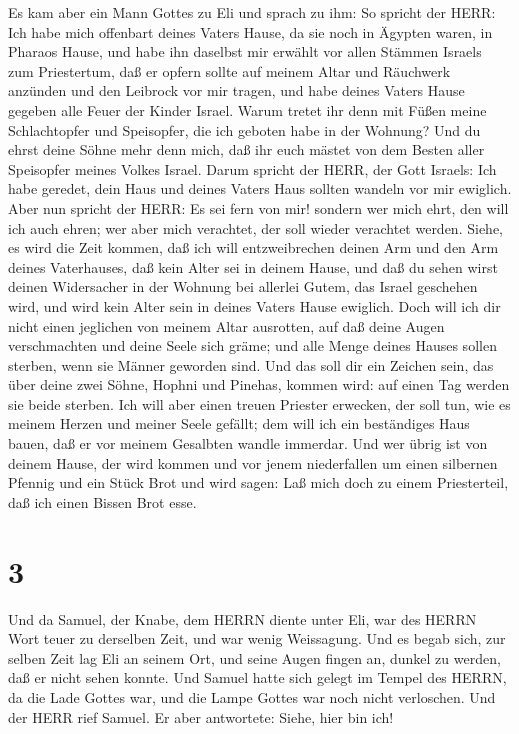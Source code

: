  Es kam aber ein Mann Gottes zu Eli und sprach zu ihm: So
spricht der HERR: Ich habe mich offenbart deines Vaters Hause, da sie
noch in Ägypten waren, in Pharaos Hause,  und habe ihn
daselbst mir erwählt vor allen Stämmen Israels zum Priestertum, daß er
opfern sollte auf meinem Altar und Räuchwerk anzünden und den Leibrock
vor mir tragen, und habe deines Vaters Hause gegeben alle Feuer der
Kinder Israel.  Warum tretet ihr denn mit Füßen meine
Schlachtopfer und Speisopfer, die ich geboten habe in der Wohnung? Und
du ehrst deine Söhne mehr denn mich, daß ihr euch mästet von dem Besten
aller Speisopfer meines Volkes Israel.  Darum spricht der
HERR, der Gott Israels: Ich habe geredet, dein Haus und deines Vaters
Haus sollten wandeln vor mir ewiglich. Aber nun spricht der HERR: Es sei
fern von mir! sondern wer mich ehrt, den will ich auch ehren; wer aber
mich verachtet, der soll wieder verachtet werden.  Siehe,
es wird die Zeit kommen, daß ich will entzweibrechen deinen Arm und den
Arm deines Vaterhauses, daß kein Alter sei in deinem Hause,
 und daß du sehen wirst deinen Widersacher in der Wohnung
bei allerlei Gutem, das Israel geschehen wird, und wird kein Alter sein
in deines Vaters Hause ewiglich.  Doch will ich dir nicht
einen jeglichen von meinem Altar ausrotten, auf daß deine Augen
verschmachten und deine Seele sich gräme; und alle Menge deines Hauses
sollen sterben, wenn sie Männer geworden sind.  Und das
soll dir ein Zeichen sein, das über deine zwei Söhne, Hophni und
Pinehas, kommen wird: auf einen Tag werden sie beide sterben.
 Ich will aber einen treuen Priester erwecken, der soll
tun, wie es meinem Herzen und meiner Seele gefällt; dem will ich ein
beständiges Haus bauen, daß er vor meinem Gesalbten wandle immerdar.
 Und wer übrig ist von deinem Hause, der wird kommen und
vor jenem niederfallen um einen silbernen Pfennig und ein Stück Brot und
wird sagen: Laß mich doch zu einem Priesterteil, daß ich einen Bissen
Brot esse.

\hypertarget{section-2}{%
\section{3}\label{section-2}}

 Und da Samuel, der Knabe, dem HERRN diente unter Eli, war
des HERRN Wort teuer zu derselben Zeit, und war wenig Weissagung.
 Und es begab sich, zur selben Zeit lag Eli an seinem Ort,
und seine Augen fingen an, dunkel zu werden, daß er nicht sehen konnte.
 Und Samuel hatte sich gelegt im Tempel des HERRN, da die
Lade Gottes war, und die Lampe Gottes war noch nicht verloschen.
 Und der HERR rief Samuel. Er aber antwortete: Siehe, hier
bin ich!

